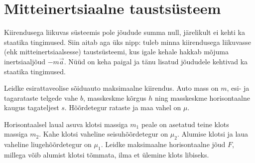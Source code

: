 \documentclass[a4paper,11pt,twocolumn]{article}
\begin{document}
\section{Mitteinertsiaalne taustsüsteem}
Kiirendusega liikuvas süsteemis pole jõudude summa null, järelikult ei kehti ka staatika tingimused. Siin aitab aga üks nipp: tuleb minna kiirendusega liikuvasse (ehk mitteinertsiaalsesse) taustsüsteemi, kus igale kehale hakkab mõjuma inertsiaaljõud $ -m\vec{a} $. Nüüd on keha paigal ja tänu lisatud jõududele kehtivad ka staatika tingimused.
\begin{question}[Lõppv 2014, G7]
	Leidke esirattaveolise sõiduauto maksimaalne kiirendus. Auto mass on $ m $, esi- ja tagarataste telgede vahe $ b $, masskeskme kõrgus $ h $ ning masskeskme horisontaalne kaugus tagateljest $ s $. Hõõrdetegur rataste ja maa vahel on $ \mu $.
\end{question}
\begin{question}[Piirk 2014, G7]
	Horisontaalsel laual asuva klotsi massiga $ m_1 $ peale on asetatud teine klots massiga $ m_2 $. Kahe klotsi vaheline seisuhõõrdetegur on $ \mu_2 $. Alumise klotsi ja laua vaheline liugehõõrdetegur on $ \mu_1 $. Leidke	maksimaalne horisontaalne jõud $ F $, millega võib alumist klotsi tõmmata, ilma et ülemine klots libiseks.
\end{question}
\end{document}
